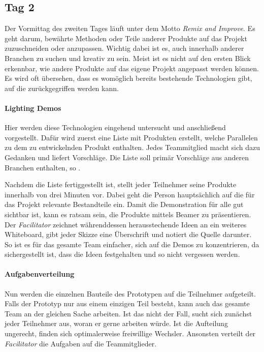 \subsection*{\label{sec:Sprint-Tag2}\thesubsection\quad Tag 2}
Der Vormittag des zweiten Tages läuft unter dem Motto \textit{Remix and Improve}. Es geht darum, bewährte Methoden oder Teile anderer Produkte auf das Projekt zuzuschneiden oder anzupassen. Wichtig dabei ist es, auch innerhalb anderer Branchen zu suchen und kreativ zu sein. Meist ist es nicht auf den ersten Blick erkennbar, wie andere Produkte auf das eigene Projekt angepasst werden können. Es wird oft übersehen, dass es womöglich bereits bestehende Technologien gibt, auf die zurückgegriffen werden kann.

\paragraph{Lighting Demos}
\label{sec:Sprint-Tag2-Demos}
Hier werden diese Technologien eingehend untersucht und anschließend vorgestellt. Dafür wird zuerst eine Liste mit Produkten erstellt, welche Parallelen zu dem zu entwickelnden Produkt enthalten. Jedes Teammitglied macht sich dazu Gedanken und liefert Vorschläge. Die Liste soll primär Vorschläge aus anderen Branchen enthalten, so .

Nachdem die Liste fertiggestellt ist, stellt jeder Teilnehmer seine Produkte innerhalb von drei Minuten vor. Dabei geht die Person hauptsächlich auf die für das Projekt relevante Bestandteile ein. Damit die Demonstration für alle gut sichtbar ist, kann es ratsam sein, die Produkte mittels Beamer zu präsentieren. Der \textit{Facilitator} zeichnet währenddessen herausstechende Ideen an ein weiteres Whiteboard, gibt jeder Skizze eine Überschrift und notiert die Quelle darunter. So ist es für das gesamte Team einfacher, sich auf die Demos zu konzentrieren, da sichergestellt ist, dass die Ideen festgehalten und so nicht vergessen werden.

\paragraph{Aufgabenverteilung}
\label{sec:Sprint-Tag2-Verteilung}
Nun werden die einzelnen Bauteile des Prototypen auf die Teilnehmer aufgeteilt. Falls der Prototyp nur aus einem einzigen Teil besteht, kann auch das gesamte Team an der gleichen Sache arbeiten. Ist das nicht der Fall, sucht sich zunächst jeder Teilnehmer aus, woran er gerne arbeiten würde. Ist die Aufteilung ungerecht, finden sich optimalerweise freiwillige Wechsler. Ansonsten verteilt der \textit{Facilitator} die Aufgaben auf die Teammitglieder.

